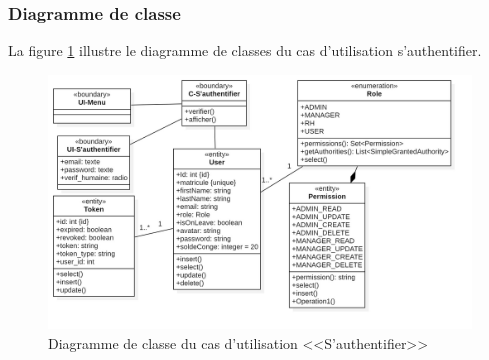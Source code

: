 \subsubsection{Diagramme de classe}
La figure \ref{fig:cauth} illustre le diagramme de classes du cas d’utilisation s'authentifier.
\begin{figure}[h]
     \centering
      \includegraphics[width=17cm]{images/C-S'authentifier.jpg}
     \caption{Diagramme de classe du cas d'utilisation <<S'authentifier>>}
     \label{fig:cauth}
 \end{figure}
